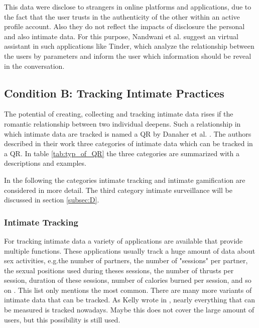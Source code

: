 This data were disclose to strangers in online platforms and applications, due to the fact that the user trusts in the authenticity of the other within an active profile account. Also they do not reflect the impacts of disclosure the personal and also intimate data. For this purpose, Nandwani et al. \cite{10.1007/978-3-319-61542-4_32} suggest an virtual assistant in such applications like Tinder, which analyze the relationship between the users by parameters and inform the user which information should be reveal in the conversation.



\subsection{Condition B: Tracking Intimate Practices}
\label{subsec:B}
The potential of creating, collecting and tracking intimate data rises if the romantic relationship between two individual deepens. Such a relationship in which intimate data are tracked is named a \ac{QR} by Danaher et al. \cite{doi:10.1080/15265161.2017.1409823}.
The authors described in their work three categories of intimate data which can be tracked in a \acs{QR}. In table \ref{tab:typ_of_QR} the three categories are summarized with a descriptions and examples.

In the following the categories intimate tracking and intimate gamification are considered in more detail.
The third category intimate surveillance will be discussed in section \ref{subsec:D}.

\subsubsection{Intimate Tracking}
For tracking intimate data a variety of applications are available that provide multiple functions. These applications usually track a huge amount of data about sex activities, e.g.the number of partners, the number of "sessions" per partner, the sexual positions used during theses sessions, the number of thrusts per session, duration of these sessions, number of calories burned per session, and so on \cite{doi:10.1080/15265161.2017.1409823}. 
This list only mentions the most common. There are many more variants of intimate data that can be tracked. As Kelly wrote in \cite{kelly2017inevitable}, nearly everything that can be measured is tracked nowadays. Maybe this does not cover the large amount of users, but this possibility is still used.

